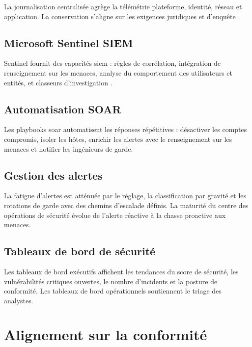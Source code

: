 La journalisation centralisée agrège la télémétrie plateforme, identité, réseau et application. La conservation s'aligne sur les exigences juridiques et d'enquête \parencite{microsoftMonitor}.

\subsection{Microsoft Sentinel SIEM}

Sentinel fournit des capacités \gls{siem} : règles de corrélation, intégration de renseignement sur les menaces, analyse du comportement des utilisateurs et entités, et classeurs d'investigation \parencite{microsoftSentinel}.

\subsection{Automatisation SOAR}

Les playbooks \gls{soar} automatisent les réponses répétitives : désactiver les comptes compromis, isoler les hôtes, enrichir les alertes avec le renseignement sur les menaces et notifier les ingénieurs de garde.

\subsection{Gestion des alertes}

La fatigue d'alertes est atténuée par le réglage, la classification par gravité et les rotations de garde avec des chemins d'escalade définis. La maturité du centre des opérations de sécurité évolue de l'alerte réactive à la chasse proactive aux menaces.

\subsection{Tableaux de bord de sécurité}

Les tableaux de bord exécutifs affichent les tendances du score de sécurité, les vulnérabilités critiques ouvertes, le nombre d'incidents et la posture de conformité. Les tableaux de bord opérationnels soutiennent le triage des analystes.


\section{Alignement sur la conformité}


